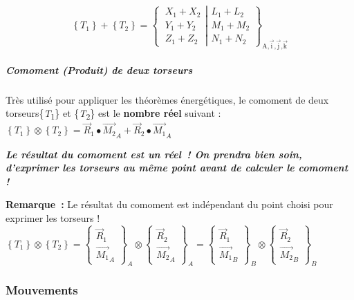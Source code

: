 \[\left\{ T_{1} \right\} + \left\{ T_{2} \right\} = \left\{ \left. \ \begin{matrix}
X_{1} + X_{2} \\
Y_{1} + Y_{2} \\
Z_{1} + Z_{2}
\end{matrix} \right|\begin{matrix}
L_{1} + L_{2} \\
M_{1} + M_{2} \\
N_{1} + N_{2}
\end{matrix} \right\}_{\text{A,}\overrightarrow{\text{i}}\text{,}\overrightarrow{\text{j}}\text{,}\overrightarrow{\text{k}}}\]

\subparagraph*{Comoment (Produit) de deux
torseurs}\label{comoment-produit-de-deux-torseurs}

Très utilisé pour appliquer les théorèmes énergétiques, le comoment de
deux torseurs\{\emph{T}\textsubscript{1}\} et
\{\emph{T}\textsubscript{2}\} est le \textbf{nombre réel} suivant :
\(\left\{ T_{1} \right\} \otimes \left\{ T_{2} \right\} = {\overrightarrow{R}}_{1} \bullet {\overrightarrow{M_{2}}}_{A} + {\overrightarrow{R}}_{2} \bullet {\overrightarrow{M_{1}}}_{A}\)

\emph{\textbf{Le résultat du comoment est un réel~! On prendra bien
soin, d'exprimer les torseurs au même point avant de calculer le
comoment !}}

\textbf{Remarque~:} Le résultat du comoment est indépendant du point
choisi pour exprimer les torseurs !
\(\left\{ T_{1} \right\} \otimes \left\{ T_{2} \right\} = \begin{Bmatrix}
{\overrightarrow{R}}_{1} \\
{\overrightarrow{M_{1}}}_{A}
\end{Bmatrix}_{A} \otimes \begin{Bmatrix}
{\overrightarrow{R}}_{2} \\
{\overrightarrow{M_{2}}}_{A}
\end{Bmatrix}_{A} = \begin{Bmatrix}
{\overrightarrow{R}}_{1} \\
{\overrightarrow{M_{1}}}_{B}
\end{Bmatrix}_{B} \otimes \begin{Bmatrix}
{\overrightarrow{R}}_{2} \\
{\overrightarrow{M_{2}}}_{B}
\end{Bmatrix}_{B}\)

\subsubsection{Mouvements}\label{mouvements}

